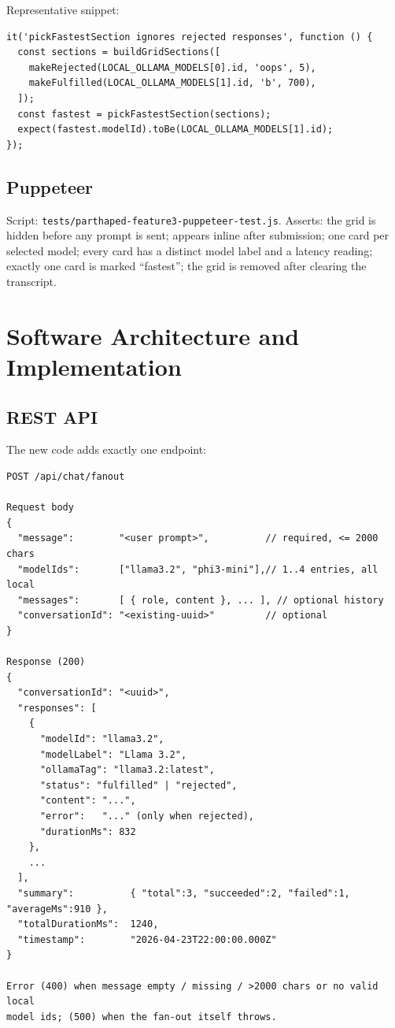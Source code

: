 \documentclass[11pt]{article}
\begin{document}
Representative snippet:

\begin{lstlisting}
it('pickFastestSection ignores rejected responses', function () {
  const sections = buildGridSections([
    makeRejected(LOCAL_OLLAMA_MODELS[0].id, 'oops', 5),
    makeFulfilled(LOCAL_OLLAMA_MODELS[1].id, 'b', 700),
  ]);
  const fastest = pickFastestSection(sections);
  expect(fastest.modelId).toBe(LOCAL_OLLAMA_MODELS[1].id);
});
\end{lstlisting}

\subsection{Puppeteer}

Script: \texttt{tests/parthaped-feature3-puppeteer-test.js}.
Asserts: the grid is hidden before any prompt is sent; appears inline
after submission; one card per selected model; every card has a
distinct model label and a latency reading; exactly one card is
marked ``fastest''; the grid is removed after clearing the
transcript.

\section{Software Architecture and Implementation}

\subsection{REST API}

The new code adds exactly one endpoint:

\begin{lstlisting}
POST /api/chat/fanout

Request body
{
  "message":        "<user prompt>",          // required, <= 2000 chars
  "modelIds":       ["llama3.2", "phi3-mini"],// 1..4 entries, all local
  "messages":       [ { role, content }, ... ], // optional history
  "conversationId": "<existing-uuid>"         // optional
}

Response (200)
{
  "conversationId": "<uuid>",
  "responses": [
    {
      "modelId": "llama3.2",
      "modelLabel": "Llama 3.2",
      "ollamaTag": "llama3.2:latest",
      "status": "fulfilled" | "rejected",
      "content": "...",
      "error":   "..." (only when rejected),
      "durationMs": 832
    },
    ...
  ],
  "summary":          { "total":3, "succeeded":2, "failed":1, "averageMs":910 },
  "totalDurationMs":  1240,
  "timestamp":        "2026-04-23T22:00:00.000Z"
}

Error (400) when message empty / missing / >2000 chars or no valid local
model ids; (500) when the fan-out itself throws.
\end{lstlisting}
\end{document}
